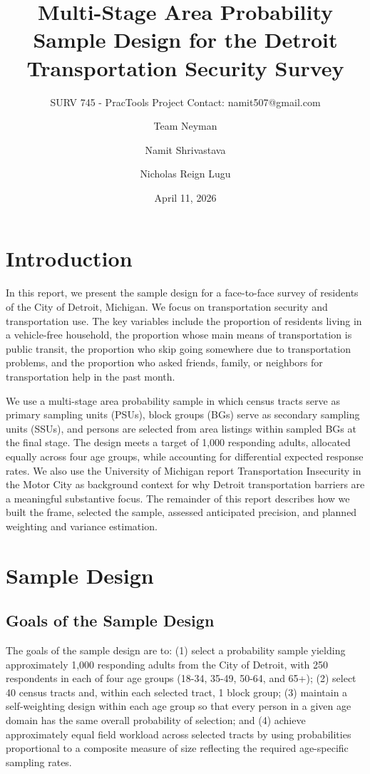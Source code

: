 \documentclass[
  11pt,
  letterpaper,
  DIV=11,
  numbers=noendperiod]{scrartcl}
\title{Multi-Stage Area Probability Sample Design for the Detroit
Transportation Security Survey}
\subtitle{SURV 745 - PracTools Project Contact: namit507@gmail.com}
\author{Team Neyman \and Namit Shrivastava \and Nicholas Reign Lugu}
\date{April 11, 2026}
\renewcommand*\contentsname{Table of contents}
\newcommand\contentsname{Table of contents}
\begin{document}
\maketitle

\renewcommand*\contentsname{Table of contents}
{
\hypersetup{linkcolor=}
\setcounter{tocdepth}{3}
\tableofcontents
}

\newpage

\section{Introduction}\label{introduction}

In this report, we present the sample design for a face-to-face survey
of residents of the City of Detroit, Michigan. We focus on
transportation security and transportation use. The key variables
include the proportion of residents living in a vehicle-free household,
the proportion whose main means of transportation is public transit, the
proportion who skip going somewhere due to transportation problems, and
the proportion who asked friends, family, or neighbors for
transportation help in the past month.

We use a multi-stage area probability sample in which census tracts
serve as primary sampling units (PSUs), block groups (BGs) serve as
secondary sampling units (SSUs), and persons are selected from area
listings within sampled BGs at the final stage. The design meets a
target of 1,000 responding adults, allocated equally across four age
groups, while accounting for differential expected response rates. We
also use the University of Michigan report Transportation Insecurity in
the Motor City as background context for why Detroit transportation
barriers are a meaningful substantive focus. The remainder of this
report describes how we built the frame, selected the sample, assessed
anticipated precision, and planned weighting and variance estimation.

\section{Sample Design}\label{sample-design}

\subsection{Goals of the Sample
Design}\label{goals-of-the-sample-design}

The goals of the sample design are to: (1) select a probability sample
yielding approximately 1,000 responding adults from the City of Detroit,
with 250 respondents in each of four age groups (18-34, 35-49, 50-64,
and 65+); (2) select 40 census tracts and, within each selected tract, 1
block group; (3) maintain a self-weighting design within each age group
so that every person in a given age domain has the same overall
probability of selection; and (4) achieve approximately equal field
workload across selected tracts by using probabilities proportional to a
composite measure of size reflecting the required age-specific sampling
rates.
\end{document}
